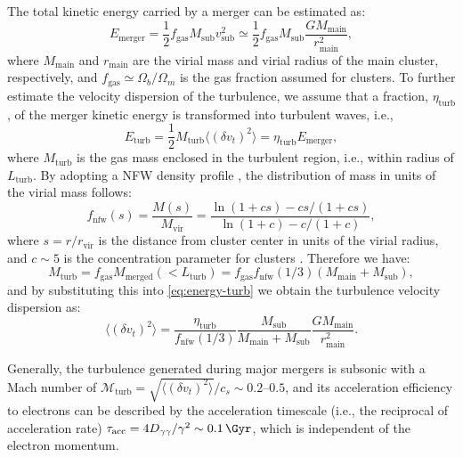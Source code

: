 \documentclass[modern]{aastex62}
\newcommand{\R}[1]{\mathrm{#1}}
\begin{document}
The total kinetic energy carried by a merger can be estimated as:
\begin{equation}
  \label{eq:energy-merger}
  E_{\R{merger}} = \frac{1}{2} f_{\R{gas}} M_{\R{sub}} v^2_{\R{sub}}
    \simeq \frac{1}{2} f_{\R{gas}} M_{\R{sub}} \frac{G M_{\R{main}}}{r^2_{\R{main}}},
\end{equation}
where $M_{\R{main}}$ and $r_{\R{main}}$ are the virial mass and virial
radius of the main cluster, respectively,
and $f_{\R{gas}} \simeq \Omega_b/\Omega_m$ is the gas fraction assumed
for clusters.
To further estimate the velocity dispersion of the turbulence, we assume
that a fraction, $\eta_{\R{turb}}$, of the merger kinetic energy is
transformed into turbulent waves, i.e.,
\begin{equation}
  \label{eq:energy-turb}
  E_{\R{turb}} = \frac{1}{2} M_{\R{turb}} \langle (\delta{v_t})^2 \rangle
    = \eta_{\R{turb}} E_{\R{merger}},
\end{equation}
where
$M_{\R{turb}}$ is the gas mass enclosed in the turbulent region, i.e.,
within radius of $L_{\R{turb}}$.
By adopting a NFW density profile \citep{navarro1997}, the distribution
of mass in units of the virial mass follows:
\begin{equation}
  \label{eq:mass-dist-nfw}
  f_{\R{nfw}}(s) = \frac{M(s)}{M_{\R{vir}}} =
    \frac{\ln(1 + c s) - c s / (1 + c s)}{\ln(1 + c) - c / (1 + c)},
\end{equation}
where $s = r / r_{\R{vir}}$ is the distance from cluster center in units
of the virial radius, and $c \sim 5$ is the concentration parameter for
clusters \citep{lokas2001}.
Therefore we have:
\begin{equation}
  \label{eq:mass-turb}
  M_{\R{turb}} = f_{\R{gas}} M_{\R{merged}}(<L_{\R{turb}})
    = f_{\R{gas}} f_{\R{nfw}}(1/3) (M_{\R{main}} + M_{\R{sub}}),
\end{equation}
and by substituting this into \autoref{eq:energy-turb} we obtain
the turbulence velocity dispersion as:
\begin{equation}
  \label{eq:turb-velocity-dispersion}
  \langle (\delta{v_t})^2 \rangle =
    \frac{\eta_{\R{turb}}}{f_{\R{nfw}}(1/3)}
    \frac{M_{\R{sub}}}{M_{\R{main}} + M_{\R{sub}}}
    \frac{G M_{\R{main}}}{r^2_{\R{main}}}.
\end{equation}

Generally, the turbulence generated during major mergers is subsonic
with a Mach number of
$\mathcal{M}_{\R{turb}} = \sqrt{\langle (\delta{v_t})^2 \rangle} / c_s \sim \numrange{0.2}{0.5}$,
and its acceleration efficiency to electrons can be described by the
acceleration timescale (i.e., the reciprocal of acceleration rate)
$\tau_{\R{acc}} = 4 D_{\gamma\gamma} / \gamma^2 \sim \SI{0.1}{\Gyr}$,
which is independent of the electron momentum.
\end{document}
